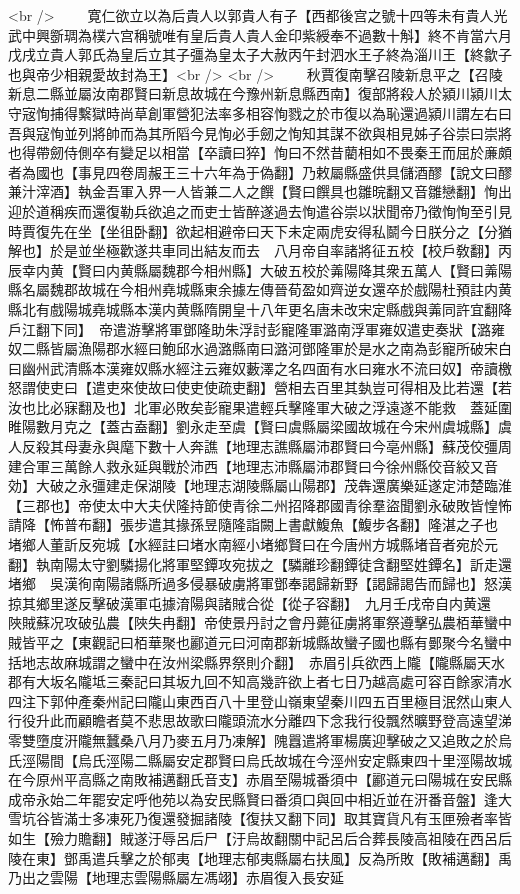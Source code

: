 <br />
　　寛仁欲立以為后貴人以郭貴人有子【西都後宫之號十四等未有貴人光武中興斵琱為樸六宫稱號唯有皇后貴人貴人金印紫綬奉不過數十斛】終不肯當六月戊戌立貴人郭氏為皇后立其子彊為皇太子大赦丙午封泗水王子終為淄川王【終歙子也與帝少相親愛故封為王】<br />
<br />
　　秋賈復南擊召陵新息平之【召陵新息二縣並屬汝南郡賢曰新息故城在今豫州新息縣西南】復部將殺人於潁川潁川太守宼恂捕得繫獄時尚草創軍營犯法率多相容恂戮之於市復以為恥還過潁川謂左右曰吾與寇恂並列將帥而為其所䧟今見恂必手劒之恂知其謀不欲與相見姊子谷崇曰崇將也得帶劒侍側卒有變足以相當【卒讀曰猝】恂曰不然昔藺相如不畏秦王而屈於亷頗者為國也【事見四卷周赧王三十六年為于偽翻】乃敕屬縣盛供具儲酒醪【說文曰醪兼汁滓酒】執金吾軍入界一人皆兼二人之饌【賢曰饌具也雛晥翻又音雛戀翻】恂出迎於道稱疾而還復勒兵欲追之而吏士皆醉遂過去恂遣谷崇以狀聞帝乃徵恂恂至引見時賈復先在坐【坐徂卧翻】欲起相避帝曰天下未定兩虎安得私鬬今日朕分之【分猶解也】於是並坐極歡遂共車同出結友而去　八月帝自率諸將征五校【校戶敎翻】丙辰幸内黄【賢曰内黄縣屬魏郡今相州縣】大破五校於羛陽降其衆五萬人【賢曰羛陽縣名屬魏郡故城在今相州堯城縣東余據左傳晉荀盈如齊逆女還卒於戲陽杜預註内黄縣北有戲陽城堯城縣本漢内黄縣隋開皇十八年更名唐未改宋定縣戲與羛同許宜翻降戶江翻下同】　帝遣游擊將軍鄧隆助朱浮討彭寵隆軍潞南浮軍雍奴遣吏奏狀【潞雍奴二縣皆屬漁陽郡水經曰鮑邱水過潞縣南曰潞河鄧隆軍於是水之南為彭寵所破宋白曰幽州武清縣本漢雍奴縣水經注云雍奴藪澤之名四面有水曰雍水不流曰奴】帝讀檄怒謂使吏曰【遣吏來使故曰使吏使疏吏翻】營相去百里其埶豈可得相及比若還【若汝也比必寐翻及也】北軍必敗矣彭寵果遣輕兵擊隆軍大破之浮遠遂不能救　蓋延圍睢陽數月克之【蓋古盍翻】劉永走至虞【賢曰虞縣屬梁國故城在今宋州虞城縣】虞人反殺其母妻永與麾下數十人奔譙【地理志譙縣屬沛郡賢曰今亳州縣】蘇茂佼彊周建合軍三萬餘人救永延與戰於沛西【地理志沛縣屬沛郡賢曰今徐州縣佼音絞又音効】大破之永彊建走保湖陵【地理志湖陵縣屬山陽郡】茂犇還廣樂延遂定沛楚臨淮【三郡也】帝使太中大夫伏隆持節使青徐二州招降郡國青徐羣盜聞劉永破敗皆惶怖請降【怖普布翻】張步遣其掾孫昱隨隆詣闕上書獻鰒魚【鰒步各翻】隆湛之子也　堵鄉人董訢反宛城【水經註曰堵水南經小堵鄉賢曰在今唐州方城縣堵音者宛於元翻】執南陽太守劉驎揚化將軍堅鐔攻宛拔之【驎離珍翻鐔徒含翻堅姓鐔名】訢走還堵鄉　吳漢徇南陽諸縣所過多侵暴破虜將軍鄧奉謁歸新野【謁歸謁告而歸也】怒漢掠其鄉里遂反擊破漢軍屯據淯陽與諸賊合從【從子容翻】　九月壬戌帝自内黄還　陜賊蘇况攻破弘農【陜失冉翻】帝使景丹討之會丹薨征虜將軍祭遵擊弘農栢華蠻中賊皆平之【東觀記曰栢華聚也酈道元曰河南郡新城縣故蠻子國也縣有鄤聚今名蠻中括地志故麻城謂之蠻中在汝州梁縣界祭則介翻】　赤眉引兵欲西上隴【隴縣屬天水郡有大坂名隴坻三秦記曰其坂九回不知高幾許欲上者七日乃越高處可容百餘家清水四注下郭仲產秦州記曰隴山東西百八十里登山嶺東望秦川四五百里極目泯然山東人行役升此而顧瞻者莫不悲思故歌曰隴頭流水分離四下念我行役飄然曠野登高遠望涕零雙墮度汧隴無蠶桑八月乃麥五月乃凍解】隗囂遣將軍楊廣迎擊破之又追敗之於烏氏涇陽間【烏氏涇陽二縣屬安定郡賢曰烏氏故城在今涇州安定縣東四十里涇陽故城在今原州平高縣之南敗補邁翻氏音支】赤眉至陽城番須中【酈道元曰陽城在安民縣成帝永始二年罷安定呼他苑以為安民縣賢曰番須口與回中相近並在汧番音盤】逢大雪坑谷皆滿士多凍死乃復還發掘諸陵【復扶又翻下同】取其寶貨凡有玉匣殮者率皆如生【殮力贍翻】賊遂汙辱呂后尸【汙烏故翻關中記呂后合葬長陵高祖陵在西呂后陵在東】鄧禹遣兵擊之於郁夷【地理志郁夷縣屬右扶風】反為所敗【敗補邁翻】禹乃出之雲陽【地理志雲陽縣屬左馮翊】赤眉復入長安延